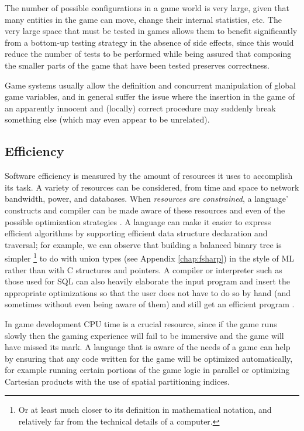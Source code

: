 The number of possible configurations in a game world is very large, given that many entities in the game can move, change their internal statistics, etc. The very large space that must be tested in games allows them to benefit significantly from a bottom-up testing strategy in the absence of side effects, since this would reduce the number of tests to be performed while being assured that composing the smaller parts of the game that have been tested preserves correctness.

Game systems usually allow the definition and concurrent manipulation of global game variables, and in general suffer the issue where the insertion in the game of an apparently innocent and (locally) correct procedure may suddenly break something else (which may even appear to be unrelated).

\subsection{Efficiency}
Software efficiency is measured by the amount of resources it uses to accomplish its task. A variety of resources can be considered, from time and space to network bandwidth, power, and databases. When \textit{resources are constrained}, a language' constructs and compiler can be made aware of these resources and even of the possible optimization strategies \cite{CHAPTER_1_COMPILER_OPTIMIZATIONS}. A language can make it easier to express efficient algorithms by supporting efficient data structure declaration and traversal; for example, we can observe that building a balanced binary tree is simpler \footnote{Or at least much closer to its definition in mathematical notation, and relatively far from the technical details of a computer.} to do with union types (see Appendix \ref{chap:fsharp}) in the style of ML rather than with C structures and pointers. A compiler or interpreter such as those used for SQL can also heavily elaborate the input program and insert the appropriate optimizations so that the user does not have to do so by hand (and sometimes without even being aware of them) and still get an efficient program \cite{DATABASE_SYSTEM_IMPLEMENTATION}.

In game development CPU time is a crucial resource, since if the game runs slowly then the gaming experience will fail to be immersive and the game will have missed its mark. A language that is aware of the needs of a game can help by ensuring that any code written for the game will be optimized automatically, for example running certain portions of the game logic in parallel or optimizing Cartesian products with the use of spatial partitioning indices.

